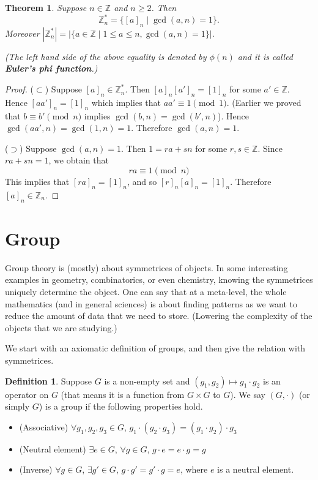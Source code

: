 \documentclass{article}
\theoremstyle{plain}
\newtheorem{theorem}{Theorem}
\theoremstyle{definition}
\newtheorem*{definition}{Definition}
\begin{document}
\begin{theorem}
    Suppose $n\in\mathbb{Z}$ and $n\geq 2$. Then
    \[\mathbb{Z}_n^*=\{[a]_n\mid \gcd(a,n)=1\}.\]
    Moreover $|\mathbb{Z}_n^*|=|\{a\in\mathbb{Z}\mid 1\leq a\leq n,\gcd(a,n)=1\}|$.

    (The left hand side of the above equality is denoted
    by $\phi(n)$ and it is called \textbf{Euler's phi function}.)
\end{theorem}

\begin{proof}
    ($\subset$) Suppose $[a]_n\in\mathbb{Z}_n^*$. Then $[a]_n[a']_n=[1]_n$
    for some $a'\in\mathbb{Z}$. Hence $[aa']_n=[1]_n$ which implies
    that $aa'\equiv 1\pmod 1$. (Earlier we proved that $b\equiv b'\pmod n$
    implies $\gcd(b,n)=\gcd(b',n)$). Hence $\gcd(aa',n)=\gcd(1,n)=1$.
    Therefore $\gcd(a,n)=1$.

    ($\supset$) Suppose $\gcd(a,n)=1$. Then $1=ra+sn$
    for some $r,s\in\mathbb{Z}$. Since $ra+sn=1$, we obtain that
    \[ra\equiv 1\pmod n\]
    This implies that $[ra]_n=[1]_n$, and so 
    $[r]_n[a]_n=[1]_n$. Therefore $[a]_n\in\mathbb{Z}_n$.
\end{proof}

\section{Group}
Group theory is (mostly) about symmetrices of objects.
In some interesting examples in geometry, combinatorics,
or even chemistry, knowing the symmetrices uniquely 
determine the object. One can say that at a meta-level,
the whole mathematics (and in general sciences) is about
finding patterns as we want to reduce the amount of
data that we need to store. (Lowering the complexity
of the objects that we are studying.)

We start with an axiomatic definition of groups, and then 
give the relation with symmetrices.
\begin{definition}
    Suppose $G$ is a non-empty set and $(g_1,g_2)\mapsto g_1\cdot g_2$
    is an operator on $G$ (that means it is a function from $G\times G$
    to $G$). We say $(G,\cdot)$ (or simply $G$) is a group if the 
    following properties hold.
    \begin{itemize}
        \item (Associative) $\forall g_1,g_2,g_3\in G$, $g_1\cdot (g_2\cdot g_3)=(g_1\cdot g_2)\cdot g_3$
        \item (Neutral element) $\exists e\in G$, $\forall g\in G$, $g\cdot e=e\cdot g=g$
        \item (Inverse) $\forall g\in G$, $\exists g'\in G$, $g\cdot g'=g'\cdot g=e$, where $e$ is a neutral element.
    \end{itemize}
\end{definition}
\end{document}
